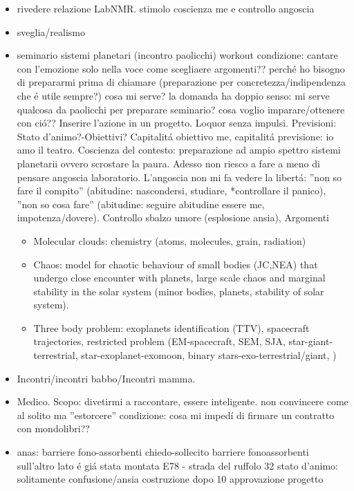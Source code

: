 \begin{itemize}
\item rivedere relazione LabNMR.
stimolo coscienza me e controllo angoscia
\item sveglia/realismo
\item seminario sistemi planetari (incontro paolicchi)
workout condizione: cantare con l'emozione solo nella voce
come scegliaere argomenti??
perch\'e ho bisogno di prepararmi prima di chiamare (preparazione per concretezza/indipendenza che \'e utile sempre?)
cosa mi serve? la domanda ha doppio senso: mi serve qualcosa da paolicchi per preparare seminario? cosa voglio imparare/ottenere con ci\'o??
Inserire l'azione in un progetto. Loquor senza impulsi.
Previsioni: Stato d'animo?-Obiettivi? Capitalit\'a obiettivo me, capitalit\'a previsione: io amo il teatro. Coscienza del contesto: preparazione ad ampio spettro sistemi planetarii ovvero scrostare la paura. 
Adesso non riesco a fare a meno di pensare angoscia laboratorio. L'angoscia non mi fa vedere la libert\'a: ''non so fare il compito'' (abitudine: nascondersi, studiare, *controllare il panico), ''non so cosa fare'' (abitudine:  seguire abitudine essere me, impotenza/dovere). Controllo sbalzo umore (esplosione ansia),
Argomenti
\begin{itemize}
\item Molecular clouds: chemistry (atoms, molecules, grain, radiation)
\item Chaos: model for chaotic behaviour of small bodies (JC,NEA) that undergo close encounter with planets, large scale chaos and marginal stability in the solar system (minor bodies, planets, stability of solar system).
\item Three body problem: exoplanets identification (TTV), spacecraft trajectories, restricted problem (EM-spacecraft, SEM, SJA, star-giant-terrestrial, star-exoplanet-exomoon, binary stars-exo-terrestrial/giant, )
\end{itemize}
\item Incontri/incontri babbo/Incontri mamma.
\item Medico. Scopo: divetirmi a raccontare, essere inteligente.
non convincere come al solito ma ''estorcere''
condizione: cosa mi imped\'i di firmare un contratto con mondolibri?? 
\item anas: barriere fono-assorbenti
chiedo-sollecito
barriere fonoassorbenti
sull'altro lato \'e gi\'a stata montata
E78 - strada del ruffolo 32
stato d'animo: solitamente confusione/ansia
costruzione dopo 10 approvazione progetto

\end{itemize}
